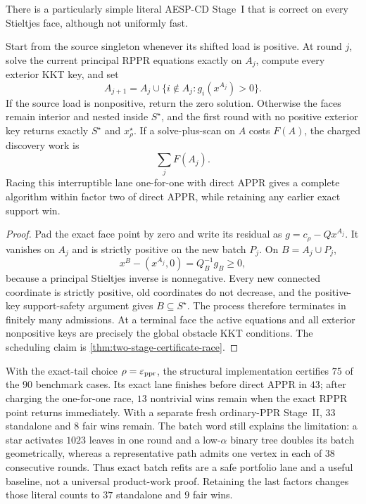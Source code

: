 There is a particularly simple literal AESP-CD Stage~I that is correct on
every Stieltjes face, although not uniformly fast.

\begin{proposition}
\label{prop:two-stage-exact-batch-refit}
Start from the source singleton whenever its shifted load is positive.
At round $j$, solve the current principal RPPR equations exactly on $A_j$,
compute every exterior KKT key, and set
\[
 A_{j+1}=A_j\cup\{i\notin A_j:g_i(x^{A_j})>0\}.
\]
If the source load is nonpositive, return the zero solution.  Otherwise the
faces remain interior and nested inside $S^\star$, and the first round with no
positive exterior key returns exactly $S^\star$ and $x_\rho^\star$.  If a
solve-plus-scan on $A$ costs $F(A)$, the charged discovery work is
\[
 \sum_j F(A_j).
\]
Racing this interruptible lane one-for-one with direct APPR gives a complete
algorithm within factor two of direct APPR, while retaining any earlier exact
support win.
\end{proposition}

\begin{proof}
Pad the exact face point by zero and write its residual as
$g=c_\rho-Qx^{A_j}$.  It vanishes on $A_j$ and is strictly positive on the
new batch $P_j$.  On $B=A_j\cup P_j$,
\[
 x^B-(x^{A_j},0)=Q_B^{-1}g_B\geq0,
\]
because a principal Stieltjes inverse is nonnegative.  Every new connected
coordinate is strictly positive, old coordinates do not decrease, and the
positive-key support-safety argument gives $B\subseteq S^\star$.  The process
therefore terminates in finitely many admissions.  At a terminal face the
active equations and all exterior nonpositive keys are precisely the global
obstacle KKT conditions.  The scheduling claim is
\cref{thm:two-stage-certificate-race}.
\end{proof}

With the exact-tail choice $\rho=\varepsilon_{\mathrm{ppr}}$, the structural implementation
certifies $75$ of the $90$ benchmark cases.  Its exact lane finishes before
direct APPR in $43$; after charging the one-for-one race, $13$ nontrivial wins
remain when the exact RPPR point returns immediately.  With a separate fresh
ordinary-PPR Stage~II, $33$ standalone and $8$ fair wins remain.  The batch word
still explains the limitation: a star activates $1023$ leaves in one round
and a low-$\alpha$ binary tree doubles its batch geometrically, whereas a
representative path admits one vertex in each of $38$ consecutive rounds.
Thus exact batch refits are a safe portfolio lane and a useful
baseline, not a universal product-work proof.
Retaining the last factors changes those literal counts to $37$ standalone
and $9$ fair wins.

